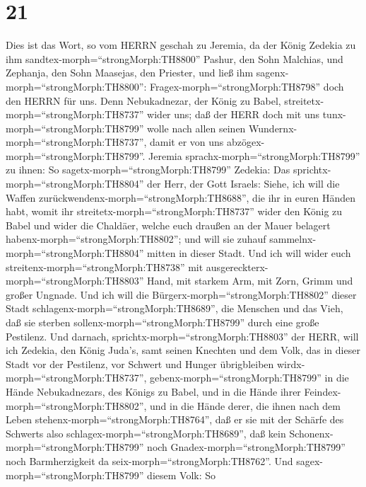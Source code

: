 \hypertarget{section-20}{%
\section{21}\label{section-20}}

 Dies ist das Wort, so vom HERRN geschah zu Jeremia, da der
König Zedekia zu ihm sandtex-morph=``strongMorph:TH8800'' Pashur, den
Sohn Malchias, und Zephanja, den Sohn Maasejas, den Priester, und ließ
ihm sagenx-morph=``strongMorph:TH8800'': 
Fragex-morph=``strongMorph:TH8798'' doch den HERRN für uns. Denn
Nebukadnezar, der König zu Babel, streitetx-morph=``strongMorph:TH8737''
wider uns; daß der HERR doch mit uns tunx-morph=``strongMorph:TH8799''
wolle nach allen seinen Wundernx-morph=``strongMorph:TH8737'', damit er
von uns abzögex-morph=``strongMorph:TH8799''.  Jeremia
sprachx-morph=``strongMorph:TH8799'' zu ihnen: So
sagetx-morph=``strongMorph:TH8799'' Zedekia:  Das
sprichtx-morph=``strongMorph:TH8804'' der Herr, der Gott Israels: Siehe,
ich will die Waffen zurückwendenx-morph=``strongMorph:TH8688'', die ihr
in euren Händen habt, womit ihr streitetx-morph=``strongMorph:TH8737''
wider den König zu Babel und wider die Chaldäer, welche euch draußen an
der Mauer belagert habenx-morph=``strongMorph:TH8802''; und will sie
zuhauf sammelnx-morph=``strongMorph:TH8804'' mitten in dieser Stadt.
 Und ich will wider euch
streitenx-morph=``strongMorph:TH8738'' mit
ausgereckterx-morph=``strongMorph:TH8803'' Hand, mit starkem Arm, mit
Zorn, Grimm und großer Ungnade.  Und ich will die
Bürgerx-morph=``strongMorph:TH8802'' dieser Stadt
schlagenx-morph=``strongMorph:TH8689'', die Menschen und das Vieh, daß
sie sterben sollenx-morph=``strongMorph:TH8799'' durch eine große
Pestilenz.  Und darnach,
sprichtx-morph=``strongMorph:TH8803'' der HERR, will ich Zedekia, den
König Juda's, samt seinen Knechten und dem Volk, das in dieser Stadt vor
der Pestilenz, vor Schwert und Hunger übrigbleiben
wirdx-morph=``strongMorph:TH8737'', gebenx-morph=``strongMorph:TH8799''
in die Hände Nebukadnezars, des Königs zu Babel, und in die Hände ihrer
Feindex-morph=``strongMorph:TH8802'', und in die Hände derer, die ihnen
nach dem Leben stehenx-morph=``strongMorph:TH8764'', daß er sie mit der
Schärfe des Schwerts also schlagex-morph=``strongMorph:TH8689'', daß
kein Schonenx-morph=``strongMorph:TH8799'' noch
Gnadex-morph=``strongMorph:TH8799'' noch Barmherzigkeit da
seix-morph=``strongMorph:TH8762''.  Und
sagex-morph=``strongMorph:TH8799'' diesem Volk: So
